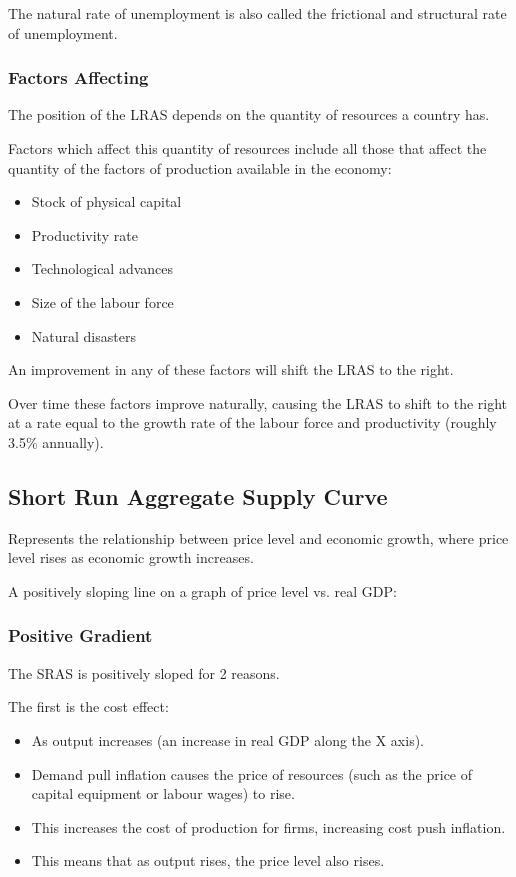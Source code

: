 \documentclass[a4paper,11pt]{report}
\begin{document}
The natural rate of unemployment is also called the frictional and structural
rate of unemployment.

\subsubsection{Factors Affecting}

The position of the LRAS depends on the quantity of resources a country has.

Factors which affect this quantity of resources include all those that affect
the quantity of the factors of production available in the economy:

\begin{itemize}
\item Stock of physical capital
\item Productivity rate
\item Technological advances
\item Size of the labour force
\item Natural disasters
\end{itemize}

An improvement in any of these factors will shift the LRAS to the right.

Over time these factors improve naturally, causing the LRAS to shift to the
right at a rate equal to the growth rate of the labour force and productivity
(roughly 3.5\% annually).

\subsection{Short Run Aggregate Supply Curve}

Represents the relationship between price level and economic growth, where
price level rises as economic growth increases.

A positively sloping line on a graph of price level vs. real GDP:


\subsubsection{Positive Gradient}

The SRAS is positively sloped for 2 reasons.


The first is the cost effect:

\begin{itemize}
\item As output increases (an increase in real GDP along the X axis).
\item Demand pull inflation causes the price of resources (such as the price of
	capital equipment or labour wages) to rise.
\item This increases the cost of production for firms, increasing cost push
	inflation.
\item This means that as output rises, the price level also rises.
\end{itemize}
\end{document}
